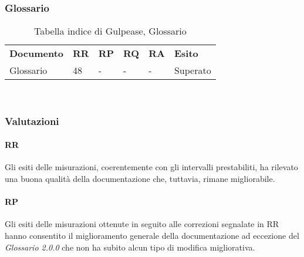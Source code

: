 \newpage
\subsubsection{Glossario}
\renewcommand{\arraystretch}{2.2}
\begin{longtable}{|C{4.5cm}|C{1.5cm}|C{1.5cm}|C{1.5cm}|C{1.5cm}|C{1.5cm}|}

	\caption{Tabella indice di Gulpease, Glossario}\\
	\hline

	\textbf{Documento} & \textbf{RR}  & \textbf{RP} & \textbf{RQ} & \textbf{RA} & \textbf{Esito}
	\tabularnewline
	\endfirsthead

	Glossario & 48  & - & - & - & Superato \\
\end{longtable}
 \\

\newpage
\subsubsection{Valutazioni}
\paragraph{RR}
Gli esiti  delle misurazioni, coerentemente con gli intervalli prestabiliti, ha rilevato una buona qualità della documentazione che, tuttavia, rimane migliorabile.

\paragraph{RP}
Gli esiti delle misurazioni ottenute in seguito alle correzioni segnalate in RR hanno consentito il miglioramento generale della documentazione ad eccezione del \textit{Glossario 2.0.0} che non ha subito alcun tipo di modifica migliorativa.\\


